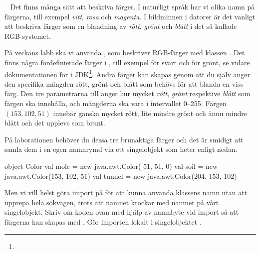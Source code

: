 \QUESTEND




\QUESTBEGIN

\Task \what~ Det finns många sätt att beskriva färger.
I naturligt språk har vi olika namn på färgerna, till exempel \emph{vitt}, \emph{rosa} och \emph{magenta}.
I bildminnen i datorer är det vanligt att beskriva färger som en blandning av \emph{rött}, \emph{grönt} och \emph{blått} i det så kallade RGB-systemet.

På veckans labb ska vi använda , som beskriver RGB-färger med klassen .
Det finns några fördefinierade färger i , till exempel  för svart och  för grönt, se vidare dokumentationen för  i JDK\footnote{\JDKApiUrl}.
Andra färger kan skapas genom att du själv anger den specifika mängden rött, grönt och blått som behövs för att blanda en viss färg.
Den tre parametrarna till  anger hur mycket \emph{rött}, \emph{grönt} respektive \emph{blått} som färgen ska innehålla, och mängderna ska vara i intervallet 0--255.
Färgen $(153, 102, 51)$ innebär ganska mycket rött, lite mindre grönt och ännu mindre blått och det upplevs som brunt.


\Subtask
På laborationen behöver du dessa tre brunaktiga färger och det är smidigt att samla dem i en egen namnrymd via ett singelobjekt som heter  enligt nedan.
\begin{Code}
object Color {
  val mole   = new java.awt.Color( 51,  51,   0)
  val soil   = new java.awt.Color(153, 102,  51)
  val tunnel = new java.awt.Color(204, 153, 102)
}
\end{Code}
\noindent Men vi vill helst göra import på  för att kunna använda klassens namn utan att upprepa hela sökvägen, trots att namnet krockar med namnet på vårt singelobjekt. Skriv om koden ovan med hjälp av namnbyte vid import så att färgerna kan skapas med . Gör importen lokalt i singelobjektet .



